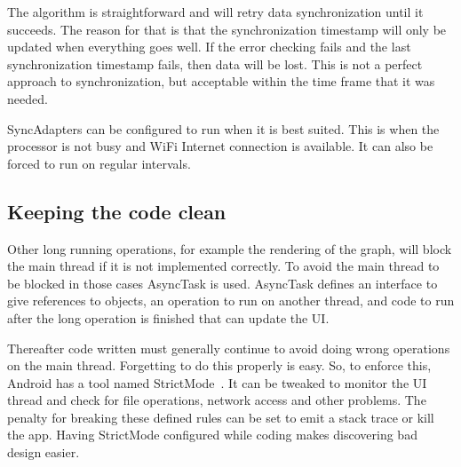 The algorithm is straightforward and will retry data synchronization until it succeeds. The reason for that is that the synchronization timestamp will only be updated when everything goes well. If the error checking fails and the last synchronization timestamp fails, then data will be lost. This is not a perfect approach to synchronization, but acceptable within the time frame that it was needed. 

SyncAdapters can be configured to run when it is best suited. This is when the processor is not busy and WiFi Internet connection is available. It can also be forced to run on regular intervals.

\subsection{Keeping the code clean}

Other long running operations, for example the rendering of the graph, will block the main thread if it is not implemented correctly. To avoid the main thread to be blocked in those cases AsyncTask is used. AsyncTask defines an interface to give references to objects, an operation to run on another thread, and code to run after the long operation is finished that can update the UI. 

Thereafter code written must generally continue to avoid doing wrong operations on the main thread. Forgetting to do this properly is easy. So, to enforce this, Android has a tool named StrictMode~\cite{androidStrictMode}. It can be tweaked to monitor the UI thread and check for file operations, network access and other problems. The penalty for breaking these defined rules can be set to emit a stack trace or kill the app. Having StrictMode configured while coding makes discovering bad design easier. 

